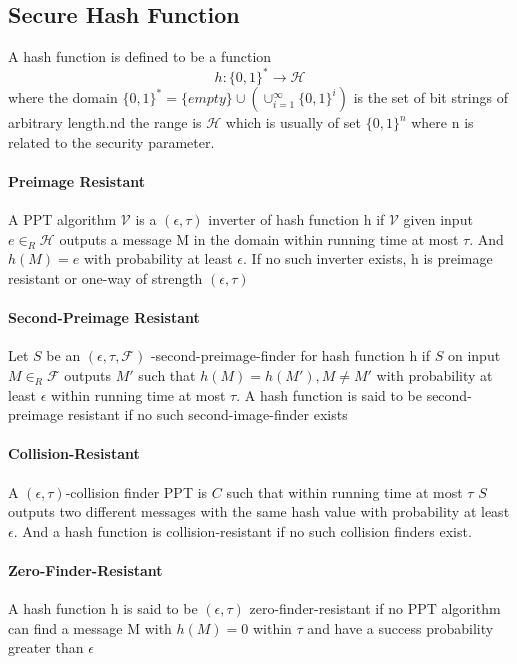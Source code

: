 \documentclass[18]{article}
\begin{document}
\subsection{Secure Hash Function}
A hash function is defined to be a function
\begin{equation*}
h:\{0,1\}^* \to \mathcal{H}
\end{equation*}
where the domain $\{0,1\}^* = \{empty\} \cup (\cup_{i=1}^{\infty}\{0,1\}^i)$ is the set of bit strings of arbitrary length.nd the range is $\mathcal{H}$ which is usually of set $\{0,1\}^n$ where n is related to the security parameter.
\paragraph{Preimage Resistant}
A PPT algorithm $\mathcal{V}$ is a $(\epsilon, \tau)$ inverter of hash function h if $\mathcal{V}$ given input $e \in_R \mathcal{H}$ outputs a message M
in the domain within running time at most $\tau$.
And $h(M)=e$ with probability at least $\epsilon$.
If no such inverter exists, h is preimage resistant or one-way of strength $(\epsilon, \tau)$\\
\paragraph{Second-Preimage Resistant}
Let $S$ be an $(\epsilon, \tau, \mathscr{F})$
-second-preimage-finder for hash function h if $S$ on
input $M\in_R\mathscr{F}$ outputs
$M\prime$ such that $h(M)=h(M\prime), M\neq M\prime$ with probability at least $\epsilon$ within running time at most $\tau$.
A hash function is said to be second-preimage resistant if no such second-image-finder exists\\
\paragraph{Collision-Resistant}
A $(\epsilon, \tau)$-collision finder PPT is $C$ such that within running time at most $\tau$ $S$ outputs two different messages with the same hash value with probability at least $\epsilon$. And a hash function is collision-resistant if no such collision finders exist.
\paragraph{Zero-Finder-Resistant}
A hash function h is said to be $(\epsilon, \tau)$ zero-finder-resistant if no PPT algorithm can find a message M with $h(M)=0$ within
$\tau$ and have a success probability greater than $\epsilon$
\end{document}
